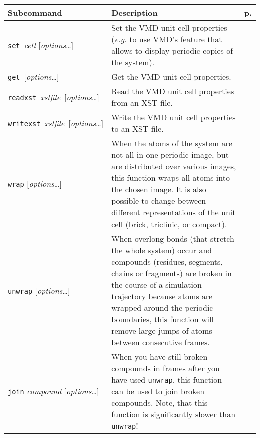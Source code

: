 \documentclass[a4paper, DIV12]{scrartcl}
\newcommand{\eg}{\emph{e.g.}\xspace}
\begin{document}
\begin{table}[p]
  \centering
  \begin{tabular}{|p{}|p{}|r|}
    \hline
    \textbf{Subcommand} & \textbf{Description} & \textbf{p.}\\\hline\hline
    
    \mbox{\texttt{set} \textit{cell}} [\textit{options}\dots]
    & Set the VMD unit cell properties (\eg to use VMD's feature that
    allows to display periodic copies of the system). 
    & \pageref{sec:set}
    \\\hline
  
    \mbox{\texttt{get} [\textit{options}\dots]}
    & Get the VMD unit cell properties. 
    & \pageref{sec:get}
    \\\hline

    \mbox{\texttt{readxst} \textit{xstfile} [\textit{options}\dots]}
    & Read the VMD unit cell properties from an XST file.
    & \pageref{sec:readxst} 
    \\\hline

    \mbox{\texttt{writexst} \textit{xstfile} [\textit{options}\dots]}
    & Write the VMD unit cell properties to an XST file.
    & \pageref{sec:writexst} 
    \\\hline
  
    \texttt{wrap} [\textit{options}\dots]
    & When the atoms of the system are not all in one periodic image,
    but are distributed over various images, this function wraps all
    atoms into the chosen image. It is also possible to change between
    different representations of the unit cell (brick, triclinic, or compact).
    & \pageref{sec:wrap}
    \\\hline
  
    \texttt{unwrap} [\textit{options}\dots]
    & When overlong bonds (that stretch the whole system) occur and
    compounds (residues, segments, chains or fragments) are broken in
    the course of a simulation trajectory because atoms are wrapped
    around the periodic boundaries, this function will remove large
    jumps of atoms between consecutive frames.
    & \pageref{sec:unwrap}
    \\\hline
  
    \texttt{join} \textit{compound} [\textit{options}\dots]
    & When you have still broken compounds in frames after you have
    used \texttt{unwrap}, this function can be used to join broken
    compounds. Note, that this function is significantly slower than
    \texttt{unwrap}!
    & \pageref{sec:join}
    \\\hline
  

\end{tabular}
\end{table}
\end{document}
